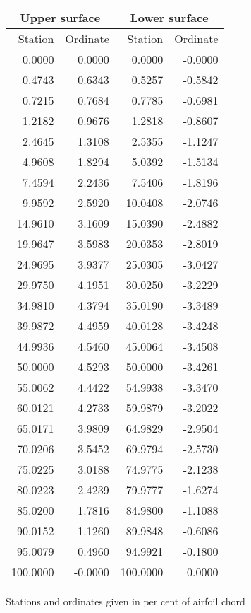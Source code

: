 \documentclass[11pt]{book}
\begin{document}
 \hspace{4mm}
 \begin{tabular}{|r|r|r|r|} \hline 
 \multicolumn{2}{|c|}{Upper surface} & \multicolumn{2}{|c|}{Lower surface} \\
 \hline
 Station & Ordinate & Station & Ordinate \\
 \hline
0.0000 & 0.0000 & 0.0000 & -0.0000 \\
0.4743 & 0.6343 & 0.5257 & -0.5842 \\
0.7215 & 0.7684 & 0.7785 & -0.6981 \\
1.2182 & 0.9676 & 1.2818 & -0.8607 \\
2.4645 & 1.3108 & 2.5355 & -1.1247 \\
4.9608 & 1.8294 & 5.0392 & -1.5134 \\
7.4594 & 2.2436 & 7.5406 & -1.8196 \\
9.9592 & 2.5920 & 10.0408 & -2.0746 \\
14.9610 & 3.1609 & 15.0390 & -2.4882 \\
19.9647 & 3.5983 & 20.0353 & -2.8019 \\
24.9695 & 3.9377 & 25.0305 & -3.0427 \\
29.9750 & 4.1951 & 30.0250 & -3.2229 \\
34.9810 & 4.3794 & 35.0190 & -3.3489 \\
39.9872 & 4.4959 & 40.0128 & -3.4248 \\
44.9936 & 4.5460 & 45.0064 & -3.4508 \\
50.0000 & 4.5293 & 50.0000 & -3.4261 \\
55.0062 & 4.4422 & 54.9938 & -3.3470 \\
60.0121 & 4.2733 & 59.9879 & -3.2022 \\
65.0171 & 3.9809 & 64.9829 & -2.9504 \\
70.0206 & 3.5452 & 69.9794 & -2.5730 \\
75.0225 & 3.0188 & 74.9775 & -2.1238 \\
80.0223 & 2.4239 & 79.9777 & -1.6274 \\
85.0200 & 1.7816 & 84.9800 & -1.1088 \\
90.0152 & 1.1260 & 89.9848 & -0.6086 \\
95.0079 & 0.4960 & 94.9921 & -0.1800 \\
100.0000 & -0.0000 & 100.0000 & 0.0000 \\
 \hline 
 \end{tabular}
 \vspace{8mm}

Stations and ordinates given in per cent of airfoil chord
\end{document}

